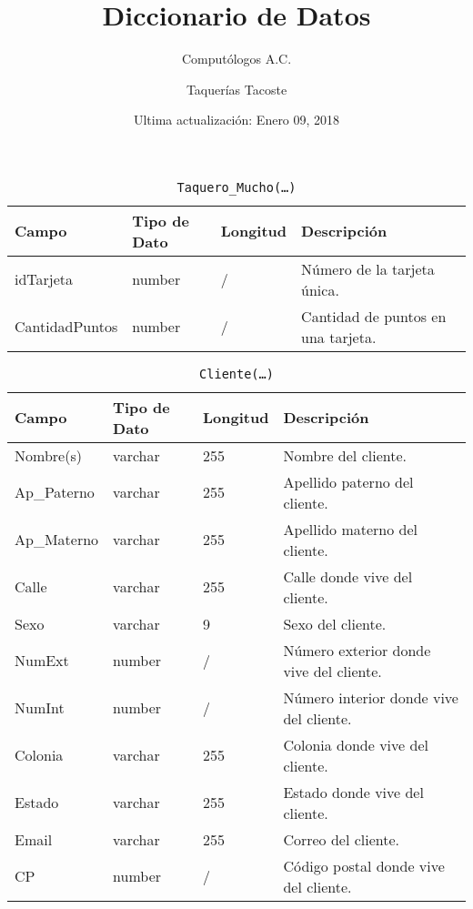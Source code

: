 \documentclass{article}
\title{Diccionario de Datos}
\author{Computólogos A.C. \and Taquerías Tacoste}
\date{Ultima actualización: Enero 09, 2018}
\begin{document}
\maketitle

\begin{table}[h]
	\centering
	\caption{\texttt{Taquero\_Mucho(\ldots)}}
	\begin{tabular}{|l|l|l|l|}
		\hline
		Campo          & Tipo de Dato & Longitud & Descripción                        \\ \hline
		idTarjeta      & number       & /       & Número de la tarjeta única.        \\ \hline
		CantidadPuntos & number       & /        & Cantidad de puntos en una tarjeta. \\ \hline
	\end{tabular}
\end{table}

\begin{table}[h]
	\centering
	\caption{\texttt{Cliente(\ldots)}}
	\begin{tabular}{|l|l|l|l|}
		\hline
		Campo       & Tipo de Dato & Longitud & Descripción                             \\ \hline
		Nombre(s)   & varchar      & 255      & Nombre del cliente.                     \\ \hline
		Ap\_Paterno & varchar      & 255      & Apellido paterno del cliente.           \\ \hline
		Ap\_Materno & varchar      & 255      & Apellido materno del cliente.           \\ \hline
		Calle       & varchar      & 255      & Calle donde vive del cliente.           \\ \hline
		Sexo 	    & varchar      & 9        & Sexo del cliente.                       \\ \hline
		NumExt      & number       & /        & Número exterior donde vive del cliente. \\ \hline
		NumInt      & number       & /        & Número interior donde vive del cliente. \\ \hline
		Colonia     & varchar      & 255      & Colonia donde vive del cliente.         \\ \hline
		Estado      & varchar      & 255      & Estado donde vive del cliente.          \\ \hline
		Email       & varchar      & 255      & Correo del cliente.                     \\ \hline
		CP          & number       & /        & Código postal donde vive del cliente.   \\ \hline
	\end{tabular}
\end{table}
\end{document}
